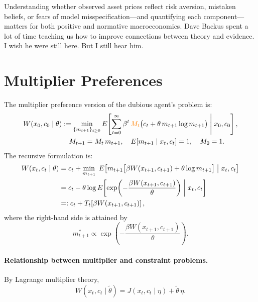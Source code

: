 \documentclass[12pt]{article}
\theoremstyle{definition}
\begin{document}
Understanding whether observed asset prices reflect risk aversion,
mistaken beliefs, or fears of model misspecification---and quantifying
each component---matters for both positive and normative
macroeconomics. Dave Backus spent a lot of time teaching us how to  improve connections  between theory and evidence. I wish he were still here. But  I  still hear him.


\appendix
\section{Multiplier Preferences}
\label{sec:multiplier}

The multiplier preference version of the dubious agent's problem is:
\begin{align}
W(x_0, c_0 \mid \theta) &:= \min_{\{m_{t+1}\}_{t\geq 0}}
    E\!\left[\sum_{t=0}^{\infty} \beta^t\,
    {\color{orange} M_t}\bigl(c_t + \theta\, m_{t+1}\log m_{t+1}\bigr)
    \;\middle|\; x_0, c_0\right], \label{eq:mult-seq}\\
&\quad M_{t+1} = M_t\, m_{t+1},\quad
    E[m_{t+1} \mid x_t, c_t] = 1,\quad M_0 = 1. \notag
\end{align}
The recursive formulation is:
\begin{align}
W(x_t, c_t \mid \theta) &= c_t + \min_{m_{t+1}}\;
    E\!\left[m_{t+1}\bigl[\beta W(x_{t+1}, c_{t+1})
    + \theta\log m_{t+1}\bigr] \;\middle|\; x_t, c_t\right] \notag\\
&= c_t - \theta\log E\!\left[\exp\!\left(
    -\frac{\beta W(x_{t+1}, c_{t+1})}{\theta}\right)
    \;\middle|\; x_t, c_t\right] \notag\\
&=: c_t + T_t\!\left[\beta W(x_{t+1}, c_{t+1})\right], \label{eq:mult-bellman}
\end{align}
where the right-hand side is attained by
\[
   m_{t+1}^* \propto \exp\!\left(
       -\frac{\beta W(x_{t+1}, c_{t+1})}{\theta}\right).
\]

\paragraph{Relationship between multiplier and constraint problems.}
By Lagrange multiplier theory,
\[
   W(x_t, c_t \mid \tilde\theta) = J(x_t, c_t \mid \eta)
       + \tilde\theta\, \eta.
\]
\end{document}
